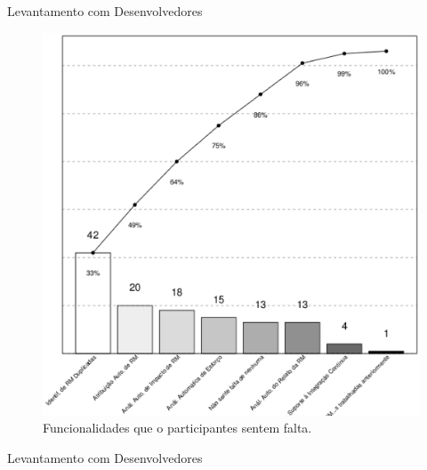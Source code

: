\documentclass[t,14pt,mathserif]{beamer}
\begin{document}
\begin{frame}{Levantamento com Desenvolvedores}

\begin{figure}[htpb]
	\centering
	\includegraphics[width=0.5\linewidth]{../img/grafico_melhorias_fgrm_funcionalidades_faltantes.eps}
	\caption{Funcionalidades que o participantes sentem falta.}
\label{fig:grafico_melhorias_fgrm_funcionalidades_falantes}
\end{figure}

\end{frame}

\begin{frame}{Levantamento com Desenvolvedores}


\begin{table}[htpb]
\centering
{}
\caption{Classificação das funcionalidades que possam dar suporte ao uso das
metodologias dos agilistas.}
\label{tab:melhorias_fgrm_suporte_particas_ageis}

\end{table}

\end{frame}
\end{document}
